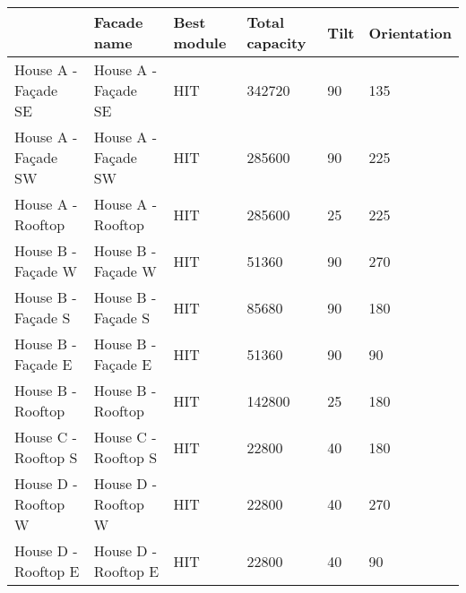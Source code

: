 \begin{tabular}{llllll}
\toprule
{} &          Facade name & Best module & Total capacity & Tilt & Orientation \\
\midrule
House A - Façade SE &  House A - Façade SE &         HIT &         342720 &   90 &         135 \\
House A - Façade SW &  House A - Façade SW &         HIT &         285600 &   90 &         225 \\
House A - Rooftop   &    House A - Rooftop &         HIT &         285600 &   25 &         225 \\
House B - Façade W  &   House B - Façade W &         HIT &          51360 &   90 &         270 \\
House B - Façade S  &   House B - Façade S &         HIT &          85680 &   90 &         180 \\
House B - Façade E  &   House B - Façade E &         HIT &          51360 &   90 &          90 \\
House B - Rooftop   &    House B - Rooftop &         HIT &         142800 &   25 &         180 \\
House C - Rooftop S &  House C - Rooftop S &         HIT &          22800 &   40 &         180 \\
House D - Rooftop W &  House D - Rooftop W &         HIT &          22800 &   40 &         270 \\
House D - Rooftop E &  House D - Rooftop E &         HIT &          22800 &   40 &          90 \\
\bottomrule
\end{tabular}

